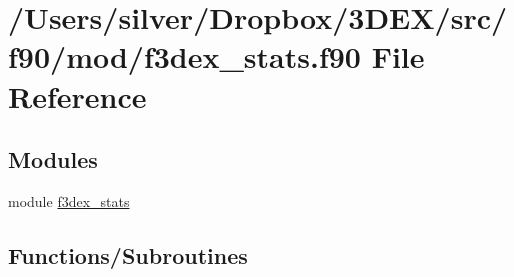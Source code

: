 \hypertarget{f3dex__stats_8f90}{
\section{/Users/silver/Dropbox/3DEX/src/f90/mod/f3dex\_\-stats.f90 File Reference}
\label{f3dex__stats_8f90}
}
\subsection*{Modules}
\begin{DoxyCompactItemize}
\item 
module \hyperlink{namespacef3dex__stats}{f3dex\_\-stats}
\end{DoxyCompactItemize}
\subsection*{Functions/Subroutines}
